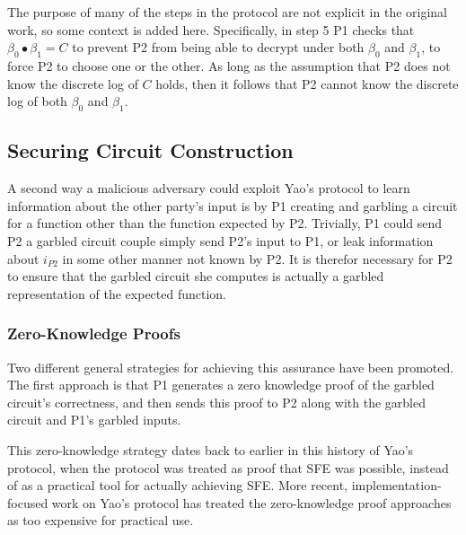 The purpose of many of the steps in the protocol are not explicit in the original work\cite{bellare1990non}, so some context is added here.  Specifically, in step 5 \ac{P1} checks that $\beta_0 \bullet \beta_1 = C$ to prevent \ac{P2} from being able to decrypt under both $\beta_0$ and $\beta_1$, to force \ac{P2} to choose one or the other. As long as the assumption that \ac{P2} does not know the discrete log of $C$ holds, then it follows that \ac{P2} cannot know the discrete log of both $\beta_0$ and $\beta_1$.



\subsection{Securing Circuit Construction}
\label{sec:securingcircuits}

A second way a malicious adversary could exploit Yao's protocol to learn information about the other party's input is by \ac{P1} creating and garbling a circuit for a function other than the function expected by \ac{P2}. Trivially, \ac{P1} could send \ac{P2} a garbled circuit couple simply send \ac{P2}'s input to \ac{P1}, or leak information about $i_{P2}$ in some other manner not known by \ac{P2}.  It is therefor necessary for \ac{P2} to ensure that the garbled circuit she computes is actually a garbled representation of the expected function.

\subsubsection{Zero-Knowledge Proofs}

Two different general strategies for achieving this assurance have been promoted.  The first approach is that \ac{P1} generates a zero knowledge proof of the garbled circuit's correctness, and then sends this proof to \ac{P2} along with the garbled circuit and \ac{P1}'s garbled inputs\cite{goldreich1987play, goldreich2009foundations}.

This zero-knowledge strategy dates back to earlier in this history of Yao's protocol, when the protocol was treated as proof that \ac{SFE} was possible, instead of as a practical tool for actually achieving \ac{SFE}. More recent, implementation-focused work on Yao's protocol has treated the zero-knowledge proof approaches as too expensive for practical use\cite{lindell2007efficient, mohassel2006efficiency, malkhi2004fairplay}.

